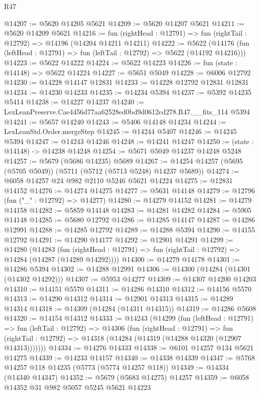 \begin{lexlean}{R47}
\begin{coremodule}
@14207 := @5620 @14205 @5621
@14209 := @5620 @14207 @5621
@14211 := @5620 @14209 @5621
@14216 := fun (rightHead : @12791) => fun (rightTail : @12792) => @14196 (@14204 @14211 @14211)
@14222 := @5622
    (@14176 (fun (leftHead : @12791) => fun (leftTail : @12792) => @5622 (@14192 @14216)))
@14223 := @5622 @14222
@14224 := @5622 @14223
@14226 := fun (state : @14148) => @5622 @14224
@14227 := @5651 @5049
@14228 := @6006 @12792
@14230 := @14228 @14147 @12831
@14233 := @14228 @12792 @12831 @12831
@14234 := @14230 @14233
@14235 := @14234 @5394
@14237 := @5392 @14235 @5414
@14238 := @14227 @14237
@14240 := LexLeanPreserve.Cae4456d77aa62528ed0bd9d0612cd278.R47.__fits_114 @5394
@14241 := @5657 @14240
@14243 := @5406 @14148 @14234
@14244 := LexLeanStd.Order.mergeStep
@14245 := @14244 @5407
@14246 := @14245 @5394
@14247 := @14243 @14246
@14248 := @14241 @14247
@14250 := (state : @14148) -> @14238 @14248
@14254 := @5671 @5049 @14237 @14248 @5248
@14257 := @5679 (@5686 @14235) @5689
@14267 := @14254 @14257 (@5695 (@5705 @5049)) (@5711 (@5712 (@5713 @5248) @14237 @5689))
@14274 := @6058 @14257 @24 @982 @2110 @5246 @5621 @14224
@14275 := @12831 @14152
@14276 := @14274 @14275
@14277 := @5631 @14148
@14279 := @12796 (fun ("_" : @12792) => @14277)
@14280 := @14279 @14152
@14281 := @14279 @14158
@14282 := @5859 @14148
@14283 := @14281 @14282
@14284 := @5905 @14148
@14285 := @5680 @12792
@14286 := @14285 @14147
@14287 := @14286 @12991
@14288 := @14285 @12792
@14289 := @14288 @5394
@14290 := @14155 @12792
@14291 := @14290 @14177
@14292 := @12901 @14291
@14299 := @14280
    (@14283
      (fun (rightHead : @12791) => fun (rightTail : @12792) => @14284 (@14287 (@14289 @14292))))
@14300 := @14279 @14178
@14301 := @14286 @5394
@14302 := @14288 @12991
@14306 := @14300 (@14284 (@14301 (@14302 @14292)))
@14307 := @5953 @14277
@14309 := @14307 @14200 @14203
@14310 := @14151 @5570
@14311 := @14286 @14310
@14312 := @14156 @5570
@14313 := @14290 @14312
@14314 := @12901 @14313
@14315 := @14289 @14314
@14318 := @14309 (@14284 (@14311 @14315))
@14319 := @14286 @5608
@14320 := @14154 @14312
@14333 := @14243
    (@14299
      (fun (leftHead : @12791) =>
      fun (leftTail : @12792) =>
      @14306
        (fun (rightHead : @12791) =>
        fun (rightTail : @12792) => @14318 (@14284 (@14319 (@14288 @14320 (@12907 @14313)))))))
@14334 := @14276 @14333
@14338 := @6101 @14257 @134 @5621 @14275
@14339 := @14233 @14157
@14340 := @14338 @14339
@14347 := @5768 @14257 @118 @14235 (@5773 (@5774 @14257 @118))
@14349 := @14334 (@14340 @14347)
@14352 := @5679 (@5683 @14275) @14257
@14359 := @6058 @14352 @31 @982 @5057 @5245 @5621 @14223

\end{coremodule}
\end{lexlean}
